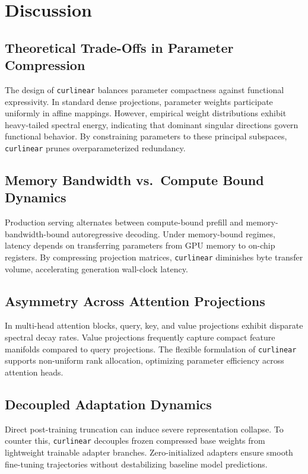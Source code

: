 \section{Discussion}

\subsection{Theoretical Trade-Offs in Parameter Compression}
The design of \texttt{curlinear} balances parameter compactness against functional expressivity. In standard dense projections, parameter weights participate uniformly in affine mappings. However, empirical weight distributions exhibit heavy-tailed spectral energy, indicating that dominant singular directions govern functional behavior. By constraining parameters to these principal subspaces, \texttt{curlinear} prunes overparameterized redundancy.

\subsection{Memory Bandwidth vs.\ Compute Bound Dynamics}
Production serving alternates between compute-bound prefill and memory-bandwidth-bound autoregressive decoding. Under memory-bound regimes, latency depends on transferring parameters from GPU memory to on-chip registers. By compressing projection matrices, \texttt{curlinear} diminishes byte transfer volume, accelerating generation wall-clock latency.

\subsection{Asymmetry Across Attention Projections}
In multi-head attention blocks, query, key, and value projections exhibit disparate spectral decay rates. Value projections frequently capture compact feature manifolds compared to query projections. The flexible formulation of \texttt{curlinear} supports non-uniform rank allocation, optimizing parameter efficiency across attention heads.

\subsection{Decoupled Adaptation Dynamics}
Direct post-training truncation can induce severe representation collapse. To counter this, \texttt{curlinear} decouples frozen compressed base weights from lightweight trainable adapter branches. Zero-initialized adapters ensure smooth fine-tuning trajectories without destabilizing baseline model predictions.

